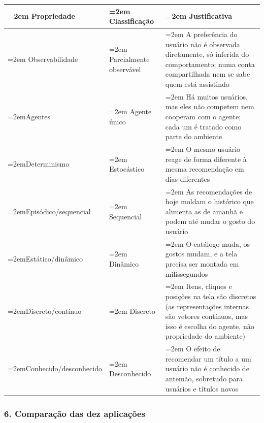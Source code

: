 \documentclass[12pt, a4paper]{article}
\begin{document}
\begingroup
\setlength{\tabcolsep}{4.0pt}
\begin{longtable}{@{}>{\raggedright\hyphenpenalty=30\tolerance=999\emergencystretch=2em\arraybackslash}p{4.51cm}>{\raggedright\hyphenpenalty=30\tolerance=999\emergencystretch=2em\arraybackslash}p{2.80cm}>{\raggedright\hyphenpenalty=30\tolerance=999\emergencystretch=2em\arraybackslash}p{7.41cm}@{}}
\toprule\noalign{}
Propriedade & Clas\-si\-fi\-ca\-ção & Justificativa \\
\midrule\noalign{}
\endhead
\bottomrule\noalign{}
\endlastfoot
Observabilidade & Parcialmente ob\-ser\-vá\-vel & A pre\-fe\-rên\-cia do usuário não é observada diretamente, só inferida do comportamento; numa conta compartilhada nem se sabe quem está assistindo \\
Agentes & Agente único & Há muitos usuários, mas eles não competem nem cooperam com o agente; cada um é tratado como parte do ambiente \\
Determinismo & Es\-to\-cás\-tico & O mesmo usuário reage de forma diferente à mesma re\-co\-men\-da\-ção em dias diferentes \\
Episódico\slash sequencial & Sequencial & As re\-co\-men\-da\-ções de hoje moldam o histórico que alimenta as de amanhã e podem até mudar o gosto do usuário \\
Estático\slash dinâmico & Dinâmico & O catálogo muda, os gostos mudam, e a tela precisa ser montada em milissegundos \\
Discreto\slash contínuo & Discreto & Itens, cliques e posições na tela são discretos (as re\-pre\-sen\-ta\-ções internas são vetores contínuos, mas isso é escolha do agente, não propriedade do ambiente\allowbreak ) \\
Conhecido\slash desconhecido & Desconhecido & O efeito de recomendar um título a um usuário não é conhecido de antemão, sobretudo para usuários e títulos novos \\
\end{longtable}
\endgroup

\subsubsection{6. Comparação das dez aplicações}\label{6-comparauxe7uxe3o-das-dez-aplicauxe7uxf5es}
\end{document}
